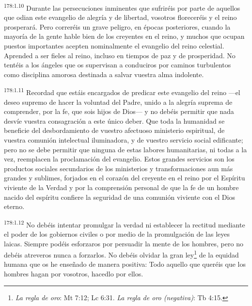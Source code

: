 \par 
\textsuperscript{178:1.10} Durante las persecuciones inminentes que sufriréis por parte de aquellos que odian este evangelio de alegría y de libertad, vosotros floreceréis y el reino prosperará. Pero correréis un grave peligro, en épocas posteriores, cuando la mayoría de la gente hable bien de los creyentes en el reino, y muchos que ocupan puestos importantes acepten nominalmente el evangelio del reino celestial. Aprended a ser fieles al reino, incluso en tiempos de paz y de prosperidad. No tentéis a los ángeles que os supervisan a conduciros por caminos turbulentos como disciplina amorosa destinada a salvar vuestra alma indolente.

\par 
\textsuperscript{178:1.11} Recordad que estáis encargados de predicar este evangelio del reino ---el deseo supremo de hacer la voluntad del Padre, unido a la alegría suprema de comprender, por la fe, que sois hijos de Dios--- y no debéis permitir que nada desvíe vuestra consagración a este único deber. Que toda la humanidad se beneficie del desbordamiento de vuestro afectuoso ministerio espiritual, de vuestra comunión intelectual iluminadora, y de vuestro servicio social edificante; pero no se debe permitir que ninguna de estas labores humanitarias, ni todas a la vez, reemplacen la proclamación del evangelio. Estos grandes servicios son los productos sociales secundarios de los ministerios y transformaciones aun más grandes y sublimes, forjados en el corazón del creyente en el reino por el Espíritu viviente de la Verdad y por la comprensión personal de que la fe de un hombre nacido del espíritu confiere la seguridad de una comunión viviente con el Dios eterno.

\par 
\textsuperscript{178:1.12} No debéis intentar promulgar la verdad ni establecer la rectitud mediante el poder de los gobiernos civiles o por medio de la promulgación de las leyes laicas. Siempre podéis esforzaros por persuadir la mente de los hombres, pero no debéis atreveros nunca a forzarlos. No debéis olvidar la gran ley\footnote{\textit{La regla de oro}: Mt 7:12; Lc 6:31. \textit{La regla de oro (negativa)}: Tb 4:15.} de la equidad humana que os he enseñado de manera positiva: Todo aquello que queréis que los hombres hagan por vosotros, hacedlo por ellos.

